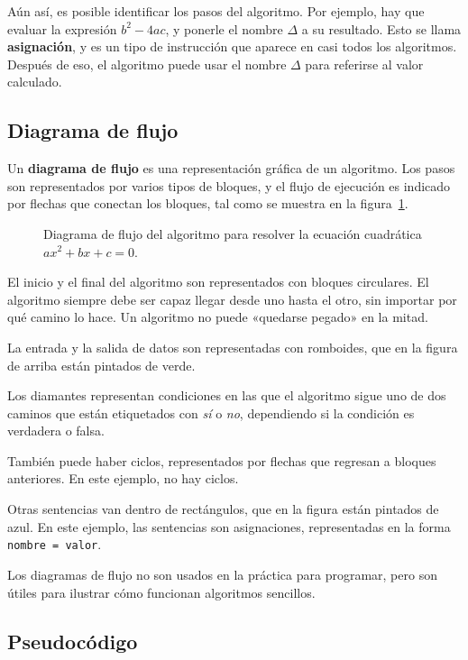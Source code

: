 Aún así, es posible identificar los pasos del algoritmo. Por ejemplo,
hay que evaluar la expresión \(b^2 - 4ac\), y ponerle el nombre \(\Delta\) a
su resultado. Esto se llama \textbf{asignación}, y es un tipo de
instrucción que aparece en casi todos los algoritmos. Después de eso, el
algoritmo puede usar el nombre \(\Delta\) para referirse al valor calculado.

\subsection{Diagrama de flujo}

Un \textbf{diagrama de flujo} es una representación gráfica de un
algoritmo. Los pasos son representados por varios tipos de bloques, y el
flujo de ejecución es indicado por flechas que conectan los bloques,
tal como se muestra en la figura~\ref{fig:diagrama-flujo-cuadratica}.

\begin{figure}
  \centering
  
  \caption{Diagrama de flujo del algoritmo para resolver
    la ecuación cuadrática \(ax^2 + bx + c = 0\).}
  \label{fig:diagrama-flujo-cuadratica}
\end{figure}

El inicio y el final del algoritmo son representados con bloques
circulares. El algoritmo siempre debe ser capaz llegar desde uno hasta
el otro, sin importar por qué camino lo hace. Un algoritmo no puede
«quedarse pegado» en la mitad.

La entrada y la salida de datos son representadas con romboides, que en
la figura de arriba están pintados de verde.

Los diamantes representan condiciones en las que el algoritmo sigue uno
de dos caminos que están etiquetados con \emph{sí} o \emph{no},
dependiendo si la condición es verdadera o falsa.

También puede haber ciclos, representados por flechas que regresan a
bloques anteriores. En este ejemplo, no hay ciclos.

Otras sentencias van dentro de rectángulos, que en la figura están
pintados de azul. En este ejemplo, las sentencias son asignaciones,
representadas en la forma \lstinline!nombre = valor!.

Los diagramas de flujo no son usados en la práctica para programar, pero
son útiles para ilustrar cómo funcionan algoritmos sencillos.

\subsection{Pseudocódigo}

